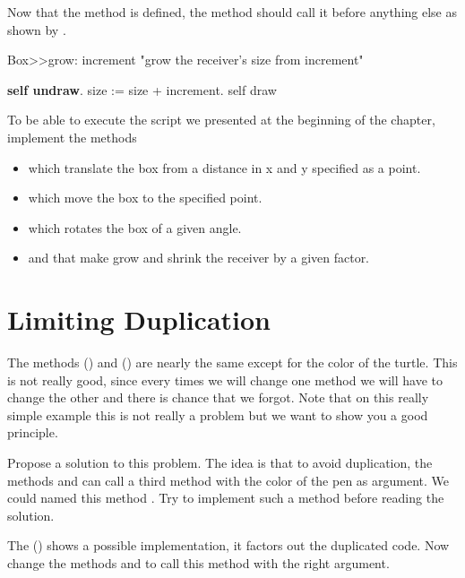 Now that the method  is defined, the method  should 
call it before anything else as shown by .

\begin{method}\label{mt:goodGrow}
Box>>grow: increment 
   "grow the receiver's size from increment"

   \textbf{self undraw}.
   size := size + increment.
   self draw
\end{method}


To be able to execute the script we presented at the beginning of the chapter, implement the methods
\begin{itemize}
\item  {} which translate the box 
from a distance in x and y specified as a point. 
\item {} which move the box to the specified point.
\item {} which rotates the box of a given angle. 
\item {} and  
that make grow and shrink the receiver by a given factor.
\end{itemize}







\section{Limiting Duplication}\label{sec:}
The methods  () and 
() are nearly the same except for the color of the
turtle.  This is not really good, since every times we will change one
method we will have to change the other and there is chance that we
forgot. Note that on this really simple example this is not really a
problem but we want to show you a good principle.

Propose a solution to this problem. The idea is that to avoid
duplication, the methods  and  can call a third
method with the color of the pen as argument. We could named this
method . Try to implement such a method before
reading the solution.

The  () shows a
possible implementation, it factors out the duplicated code. Now
change the methods  and  to call this method with
the right argument.


